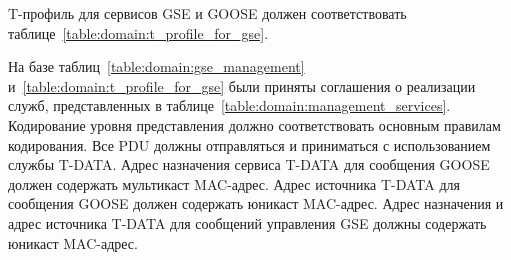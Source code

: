 T-профиль для сервисов GSE и GOOSE должен соответствовать
таблице~\ref{table:domain:t_profile_for_gse}.

На базе таблиц~\ref{table:domain:gse_management}
и~\ref{table:domain:t_profile_for_gse} были приняты соглашения о реализации служб,
представленных в таблице~\ref{table:domain:management_services}. Кодирование уровня
представления должно соответствовать основным правилам кодирования. Все PDU должны
отправляться и приниматься с использованием службы T-DATA. Адрес назначения сервиса
T-DATA для сообщения GOOSE должен содержать мультикаст MAC-адрес. Адрес источника
T-DATA для сообщения GOOSE должен содержать юникаст MAC-адрес. Адрес назначения
и адрес источника T-DATA для сообщений управления GSE должны содержать юникаст
MAC-адрес.


